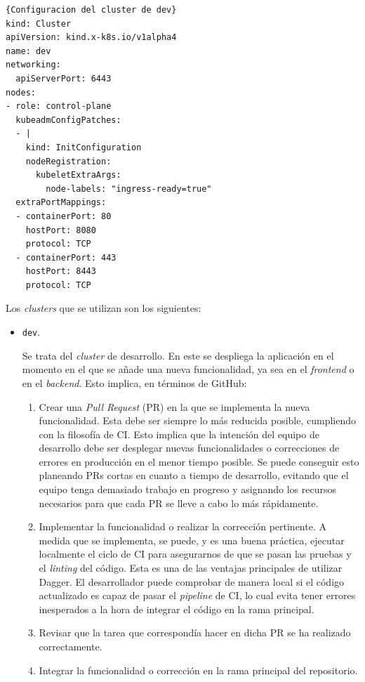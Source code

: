 \begin{lstlisting}[language=helm,label=lst:conf-cluster]{Configuracion del cluster de dev}
kind: Cluster
apiVersion: kind.x-k8s.io/v1alpha4
name: dev
networking:
  apiServerPort: 6443
nodes:
- role: control-plane
  kubeadmConfigPatches:
  - |
    kind: InitConfiguration
    nodeRegistration:
      kubeletExtraArgs:
        node-labels: "ingress-ready=true"
  extraPortMappings:
  - containerPort: 80
    hostPort: 8080
    protocol: TCP
  - containerPort: 443
    hostPort: 8443
    protocol: TCP
\end{lstlisting}

Los \textit{clusters} que se utilizan son los siguientes:

\begin{itemize}
  \item \texttt{dev}.

    Se trata del \textit{cluster} de desarrollo. En este se despliega la aplicación en el momento en el que se añade una nueva funcionalidad, ya sea en el \textit{frontend} o en el \textit{backend}. Esto implica, en términos de GitHub:

    \begin{enumerate}
      \item Crear una \textit{Pull Request} (PR) en la que se implementa la nueva funcionalidad. Esta debe ser siempre lo más reducida posible, cumpliendo con la filosofía de CI. Esto implica que la intención del equipo de desarrollo debe ser desplegar nuevas funcionalidades o correcciones de errores en producción en el menor tiempo posible. Se puede conseguir esto planeando PRs cortas en cuanto a tiempo de desarrollo, evitando que el equipo tenga demasiado trabajo en progreso y asignando los recursos necesarios para que cada PR se lleve a cabo lo más rápidamente\cite{linear}.
      \item Implementar la funcionalidad o realizar la corrección pertinente. A medida que se implementa, se puede, y es una buena práctica, ejecutar localmente el ciclo de CI para asegurarnos de que se pasan las pruebas y el \textit{linting} del código. Esta es una de las ventajas principales de utilizar Dagger. El desarrollador puede comprobar de manera local si el código actualizado es capaz de pasar el \textit{pipeline} de CI, lo cual evita tener errores inesperados a la hora de integrar el código en la rama principal.
      \item Revisar que la tarea que correspondía hacer en dicha PR se ha realizado correctamente.
      \item Integrar la funcionalidad o corrección en la rama principal del repositorio.
    \end{enumerate}


\end{itemize}

